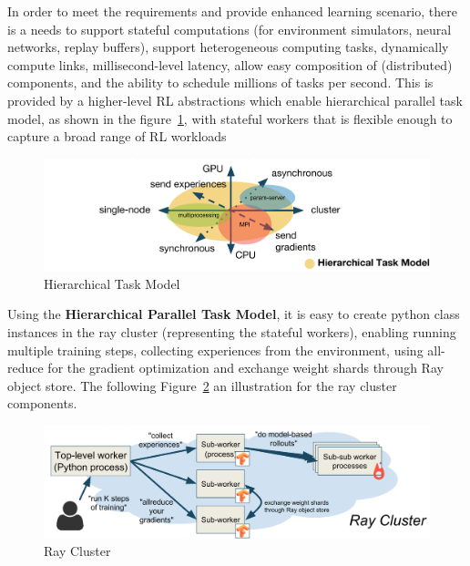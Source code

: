In order to meet the requirements and provide enhanced learning scenario, there is a needs to support stateful computations (for environment simulators, neural networks, replay buffers), support heterogeneous computing tasks, dynamically compute links, millisecond-level latency, allow easy composition of (distributed) components, and the ability to schedule millions of tasks per second. This is provided by a higher-level RL abstractions which enable hierarchical parallel task model, as shown in the figure~\ref{fig:rl_htm}, with stateful workers that is flexible enough to capture a broad range of RL workloads 
\begin{figure}[!htb]
	\centering
	\includegraphics[width=\linewidth]{figures/architecture/htm.png}
	\caption[Hierarchical Task Model]{Hierarchical Task Model\footnotemark}
	\label{fig:rl_htm}
\end{figure}

Using the \textbf{Hierarchical Parallel Task Model}, it is easy to create python class instances in the ray cluster (representing the stateful workers), enabling running multiple training steps, collecting experiences from the environment, using all-reduce for the gradient optimization and exchange weight shards through Ray object store. The following Figure~\ref{fig:ray_cluster} an illustration for the ray cluster components.
\begin{figure}[!htb]
	\centering
	\includegraphics[width=\linewidth]{figures/architecture/ray_cluster.png}
	\caption[Ray Cluster]{Ray Cluster\footnotemark}
	\label{fig:ray_cluster}
\end{figure}


